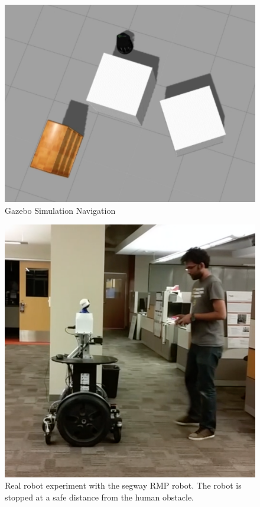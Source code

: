 \documentclass[conference]{IEEEtran}
\begin{document}
\begin{figure}[h!]
\centering
\includegraphics[scale=0.3]{Gazebo_exp.png} 
\caption{Gazebo Simulation Navigation\label{fig:gazebo}}
\end{figure}

\begin{figure}[h!]
\centering
\includegraphics[scale=0.13]{jeeves_exp.png} 
\caption{Real robot experiment with the segway RMP robot. The robot is stopped at a safe distance from the human obstacle. \label{fig:jeeves_exp}}
\end{figure}
\end{document}
